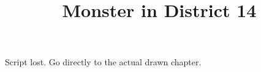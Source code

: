\documentclass[11pt]{article}
\begin{document}
\ttfamily
\title{Monster in District 14}
\maketitle
Script lost. Go directly to the actual drawn chapter.
\end{document}
